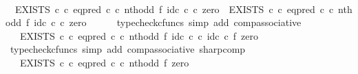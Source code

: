 \begin{isabellebody}
%
\isadelimproof
%
\endisadelimproof
%
\isatagproof
{}\isamarkupfalse%
\ {\isacharminus}{\kern0pt}\isanewline
\ \ \isamarkupfalse%
\ \ {\isachardoublequoteopen}{\isacharparenleft}{\kern0pt}EXISTS\ {\isasymnat}\isactrlsub c\ {\isasymcirc}\isactrlsub c\ {\isacharparenleft}{\kern0pt}eq{\isacharunderscore}{\kern0pt}pred\ {\isasymnat}\isactrlsub c\ {\isasymcirc}\isactrlsub c\ nth{\isacharunderscore}{\kern0pt}odd\ {\isasymtimes}\isactrlsub f\ id\isactrlsub c\ {\isasymnat}\isactrlsub c{\isacharparenright}{\kern0pt}\isactrlsup {\isasymsharp}{\isacharparenright}{\kern0pt}\ {\isasymcirc}\isactrlsub c\ zero\ {\isacharequal}{\kern0pt}\ EXISTS\ {\isasymnat}\isactrlsub c\ {\isasymcirc}\isactrlsub c\ {\isacharparenleft}{\kern0pt}eq{\isacharunderscore}{\kern0pt}pred\ {\isasymnat}\isactrlsub c\ {\isasymcirc}\isactrlsub c\ nth{\isacharunderscore}{\kern0pt}odd\ {\isasymtimes}\isactrlsub f\ id\isactrlsub c\ {\isasymnat}\isactrlsub c{\isacharparenright}{\kern0pt}\isactrlsup {\isasymsharp}\ {\isasymcirc}\isactrlsub c\ zero{\isachardoublequoteclose}\isanewline
\ \ \ \ \isamarkupfalse%
\ {\isacharparenleft}{\kern0pt}typecheck{\isacharunderscore}{\kern0pt}cfuncs{\isacharcomma}{\kern0pt}\ simp\ add{\isacharcolon}{\kern0pt}\ comp{\isacharunderscore}{\kern0pt}associative{}{\isacharparenright}{\kern0pt}\isanewline
\ \ \isamarkupfalse%
\ \isamarkupfalse%
\ {\isachardoublequoteopen}{\isachardot}{\kern0pt}{\isachardot}{\kern0pt}{\isachardot}{\kern0pt}\ {\isacharequal}{\kern0pt}\ EXISTS\ {\isasymnat}\isactrlsub c\ {\isasymcirc}\isactrlsub c\ {\isacharparenleft}{\kern0pt}eq{\isacharunderscore}{\kern0pt}pred\ {\isasymnat}\isactrlsub c\ {\isasymcirc}\isactrlsub c\ {\isacharparenleft}{\kern0pt}nth{\isacharunderscore}{\kern0pt}odd\ {\isasymtimes}\isactrlsub f\ id\isactrlsub c\ {\isasymnat}\isactrlsub c{\isacharparenright}{\kern0pt}\ {\isasymcirc}\isactrlsub c\ {\isacharparenleft}{\kern0pt}id\isactrlsub c\ {\isasymnat}\isactrlsub c\ {\isasymtimes}\isactrlsub f\ zero{\isacharparenright}{\kern0pt}{\isacharparenright}{\kern0pt}\isactrlsup {\isasymsharp}{\isachardoublequoteclose}\isanewline
\ \ \ \ \isamarkupfalse%
\ {\isacharparenleft}{\kern0pt}typecheck{\isacharunderscore}{\kern0pt}cfuncs{\isacharcomma}{\kern0pt}\ simp\ add{\isacharcolon}{\kern0pt}\ comp{\isacharunderscore}{\kern0pt}associative{}\ sharp{\isacharunderscore}{\kern0pt}comp{\isacharparenright}{\kern0pt}\isanewline
\ \ \isamarkupfalse%
\ \isamarkupfalse%
\ {\isachardoublequoteopen}{\isachardot}{\kern0pt}{\isachardot}{\kern0pt}{\isachardot}{\kern0pt}\ {\isacharequal}{\kern0pt}\ EXISTS\ {\isasymnat}\isactrlsub c\ {\isasymcirc}\isactrlsub c\ {\isacharparenleft}{\kern0pt}eq{\isacharunderscore}{\kern0pt}pred\ {\isasymnat}\isactrlsub c\ {\isasymcirc}\isactrlsub c\ {\isacharparenleft}{\kern0pt}nth{\isacharunderscore}{\kern0pt}odd\ {\isasymtimes}\isactrlsub f\ zero{\isacharparenright}{\kern0pt}{\isacharparenright}{\kern0pt}\isactrlsup {\isasymsharp}{\isachardoublequoteclose}\isanewline

\end{isabellebody}
